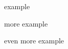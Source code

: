 \begin{frame}

\begin{block}{}
	example
\end{block}
\begin{block}{}
	more example
\end{block}
\begin{block}{}
	even more example
\end{block}
\end{frame}

